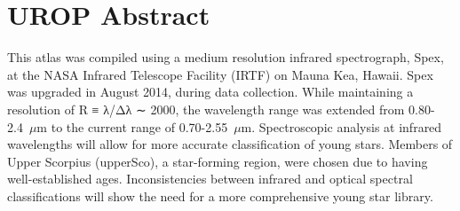 \section{UROP Abstract}

This atlas was compiled using a medium resolution infrared spectrograph, Spex, at the NASA Infrared Telescope Facility (IRTF) on Mauna Kea, Hawaii.  Spex was upgraded in August 2014, during data collection.  While maintaining a resolution of R ≡ λ/Δλ ∼ 2000, the wavelength range was extended from 0.80-2.4~$\mu$m to the current range of 0.70-2.55~$\mu$m.  Spectroscopic analysis at infrared wavelengths will allow for more accurate classification of young stars.  Members of Upper Scorpius (upperSco), a star-forming region, were chosen due to having well-established ages.  Inconsistencies between infrared and optical spectral classifications will show the need for a more comprehensive young star library.